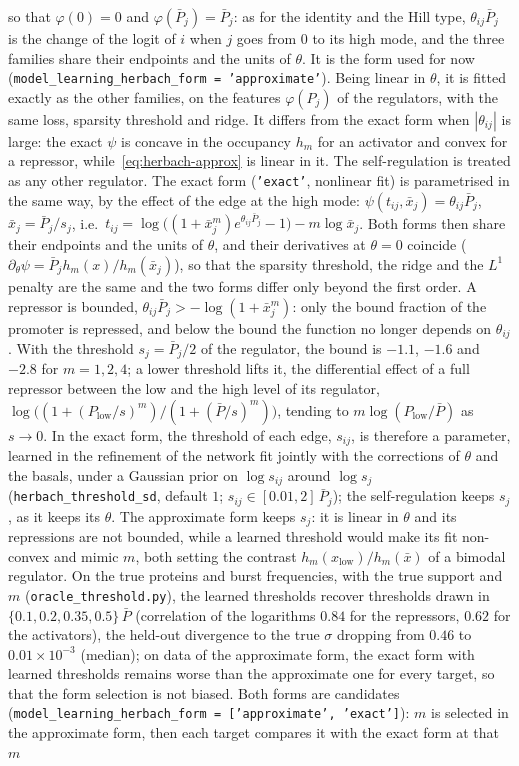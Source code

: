 \documentclass[a4paper, 11pt]{article}
\theoremstyle{plain}
\theoremstyle{remark}
\begin{document}
so that $\varphi(0) = 0$ and $\varphi(\bar P_j) = \bar P_j$: as for the identity and the Hill type, $\theta_{ij}\bar P_j$ is the change of the logit of $i$ when $j$ goes from $0$ to its high mode, and the three families share their endpoints and the units of $\theta$. It is the form used for now (\texttt{model\_learning\_herbach\_form = 'approximate'}). Being linear in $\theta$, it is fitted exactly as the other families, on the features $\varphi(P_j)$ of the regulators, with the same loss, sparsity threshold and ridge. It differs from the exact form when $|\theta_{ij}|$ is large: the exact $\psi$ is concave in the occupancy $h_m$ for an activator and convex for a repressor, while~\eqref{eq:herbach-approx} is linear in it. The self-regulation is treated as any other regulator. The exact form (\texttt{'exact'}, nonlinear fit) is parametrised in the same way, by the effect of the edge at the high mode: $\psi(t_{ij}, \bar x_j) = \theta_{ij}\bar P_j$, $\bar x_j = \bar P_j/s_j$, i.e.\ $t_{ij} = \log\bigl((1 + \bar x_j^m)e^{\theta_{ij}\bar P_j} - 1\bigr) - m\log\bar x_j$. Both forms then share their endpoints and the units of $\theta$, and their derivatives at $\theta = 0$ coincide ($\partial_\theta\psi = \bar P_j h_m(x)/h_m(\bar x_j)$), so that the sparsity threshold, the ridge and the $L^1$ penalty are the same and the two forms differ only beyond the first order. A repressor is bounded, $\theta_{ij}\bar P_j > -\log(1 + \bar x_j^m)$: only the bound fraction of the promoter is repressed, and below the bound the function no longer depends on $\theta_{ij}$. With the threshold $s_j = \bar P_j/2$ of the regulator, the bound is $-1.1$, $-1.6$ and $-2.8$ for $m = 1, 2, 4$; a lower threshold lifts it, the differential effect of a full repressor between the low and the high level of its regulator, $\log\bigl((1 + (P_{\mathrm{low}}/s)^m)/(1 + (\bar P/s)^m)\bigr)$, tending to $m\log(P_{\mathrm{low}}/\bar P)$ as $s \to 0$. In the exact form, the threshold of each edge, $s_{ij}$, is therefore a parameter, learned in the refinement of the network fit jointly with the corrections of $\theta$ and the basals, under a Gaussian prior on $\log s_{ij}$ around $\log s_j$ (\texttt{herbach\_threshold\_sd}, default $1$; $s_{ij} \in [0.01, 2]\,\bar P_j$); the self-regulation keeps $s_j$, as it keeps its $\theta$. The approximate form keeps $s_j$: it is linear in $\theta$ and its repressions are not bounded, while a learned threshold would make its fit non-convex and mimic $m$, both setting the contrast $h_m(x_{\mathrm{low}})/h_m(\bar x)$ of a bimodal regulator. On the true proteins and burst frequencies, with the true support and $m$ (\texttt{oracle\_threshold.py}), the learned thresholds recover thresholds drawn in $\{0.1, 0.2, 0.35, 0.5\}\,\bar P$ (correlation of the logarithms $0.84$ for the repressors, $0.62$ for the activators), the held-out divergence to the true $\sigma$ dropping from $0.46$ to $0.01 \times 10^{-3}$ (median); on data of the approximate form, the exact form with learned thresholds remains worse than the approximate one for every target, so that the form selection is not biased. Both forms are candidates (\texttt{model\_learning\_herbach\_form = ['approximate', 'exact']}): $m$ is selected in the approximate form, then each target compares it with the exact form at that $m$ 
\end{document}
